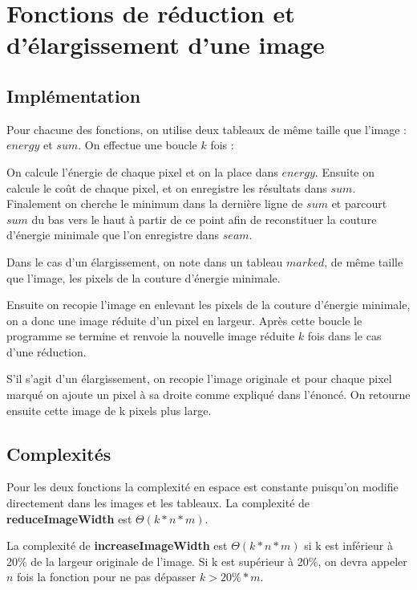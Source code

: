 \section{Fonctions de réduction et d'élargissement d'une image} %
\subsection{Implémentation} %
Pour chacune des fonctions, on utilise deux tableaux de même taille que l'image : $energy$ et $sum$. 
On effectue une boucle $k$ fois :

On calcule l'énergie de chaque pixel et on la place dans $energy$.
Ensuite on calcule le coût de chaque pixel, et on enregistre les résultats dans $sum$.
Finalement on cherche le minimum dans la dernière ligne de $sum$ et parcourt $sum$ du bas vers le haut à partir de ce point afin de reconstituer la couture d'énergie minimale que l'on enregistre dans $seam$.

Dans le cas d'un élargissement, on note dans un tableau $marked$, de même taille que l'image, les pixels de la couture d'énergie minimale.

Ensuite on recopie l'image en enlevant les pixels de la couture d'énergie minimale, on a donc une image réduite d'un pixel en largeur.
\bigbreak
Après cette boucle le programme se termine et renvoie la nouvelle image réduite $k$ fois dans le cas d'une réduction. 

S'il s'agit d'un élargissement, on recopie l'image originale et pour chaque pixel marqué on ajoute un pixel à sa droite comme expliqué dans l'énoncé. On retourne ensuite cette image de k pixels plus large.
\subsection{Complexités} %
Pour les deux fonctions la complexité en espace est constante puisqu'on modifie directement dans les images et les tableaux.
La complexité de \textbf{reduceImageWidth} est $\Theta(k*n*m)$.

La complexité de \textbf{increaseImageWidth} est $\Theta(k*n*m)$ si k est inférieur à 20\% de la largeur originale de l'image. Si k est supérieur à 20\%, on devra appeler $n$ fois la fonction pour ne pas dépasser $k > 20\% * m$.

